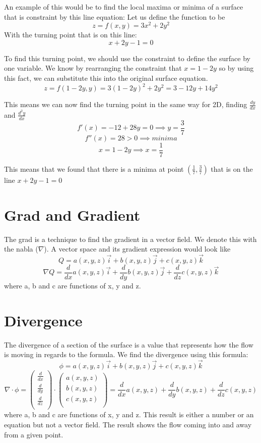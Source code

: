 \documentclass{article}
\begin{document}
An example of this would be to find the local maxima or minima of a surface that is constraint by this line equation:
Let us define the function to be 
$$z = f(x,y) = 3x^2 +2y^2 $$
With the turning point that is on this line:
$$x +2y -1 =0 $$

To find this turning point, we should use the constraint to define the surface by one variable. We know by rearranging the constraint that $x = 1 - 2y$ so by using this fact, we can substitute this into the original surface equation.
$$z = f(1-2y,y) = 3(1-2y)^2+2y^2 = 3-12y+14y^2 $$

This means we can now find the turning point in the same way for 2D, finding $\frac{dy}{dx}$ and $\frac{d^2y}{dx}$ 
$$f'(x) = -12+28y = 0 \implies y = \frac{3}{7}$$
$$f''(x) = 28 >0 \implies minima $$
$$ x = 1-2y \implies x = \frac{1}{7} $$

This means that we found that there is a minima at point $(\frac{1}{7}, \frac{3}{7})$ that is on the line $x+2y-1=0$


\section{Grad and Gradient}
The grad is a technique to find the gradient in a vector field. We denote this with the nabla ($\nabla$). A vector space and its gradient expression would look like
$$ Q = a(x,y,z) \Vec{i} +b(x,y,z)\Vec{j} + c(x,y,z)\Vec{k}$$
$$ \nabla Q = \frac{d}{dx} a(x,y,z) \Vec{i} + \frac{d}{dy} b(x,y,z)\Vec{j} + \frac{d}{dz} c(x,y,z)\Vec{k}$$
where a, b and c are functions of x, y and z.


\section{Divergence}
The divergence of a section of the surface is a value that represents how the flow is moving in regards to the formula.
We find the divergence using this formula:
$$\phi  = a(x,y,z) \Vec{i} +b(x,y,z)\Vec{j} + c(x,y,z)\Vec{k}$$
$$ \nabla \cdot \phi = \left(
\begin{array}{c}
     \frac{d}{dx}  \\
     \frac{d}{dy} \\
     \frac{d}{dz} \\
\end{array}
\right) \cdot \left(
\begin{array}{c}
     a(x,y,z)  \\
     b(x,y,z) \\
     c(x,y,z) \\
\end{array}
\right)  = \frac{d}{dx} a(x,y,z) + \frac{d}{dy} b(x,y,z) + \frac{d}{dz} c(x,y,z) $$
where a, b and c are functions of x, y and z. This result is either a number or an equation but not a vector field.
The result shows the flow coming into and away from a given point.
\end{document}
